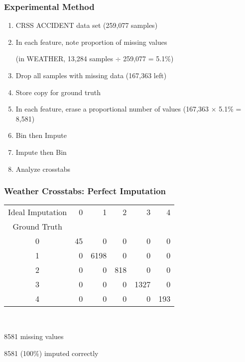 \begin{frame}[t]
	\frametitle{Experimental Method}
	\Large
	
	\begin{enumerate}
		\item CRSS ACCIDENT data set (259,077 samples)
		\item In each feature, note proportion of missing values 
		
		(in WEATHER, 13,284 samples $\div$ 259,077 =  5.1\%)
		\item Drop all samples with missing data (167,363 left)
		\item Store copy for ground truth
		\item In each feature, erase a proportional number of values (167,363 $\times$ 5.1\% = 8,581)
		\item Bin then Impute
		\item Impute then Bin
		\item Analyze crosstabs
		
	\end{enumerate}
\end{frame}


\begin{frame}[t]
	\frametitle{Weather Crosstabs:  Perfect Imputation}
	\Large

\begin{tabular}{crrrrr}
Ideal Imputation &   0 &     1 &    2 &     3 &    4 \\
Ground Truth &     &       &      &       &      \\
\hline
0              &  45 &     0 &    0 &     0 &    0 \\
1              &   0 &  6198 &    0 &     0 &    0 \\
2              &   0 &     0 &  818 &     0 &    0 \\
3              &   0 &     0 &    0 &  1327 &    0 \\
4              &   0 &     0 &    0 &     0 &  193 \\\end{tabular}

\

8581 missing values

8581 (100\%) imputed correctly

\end{frame}

